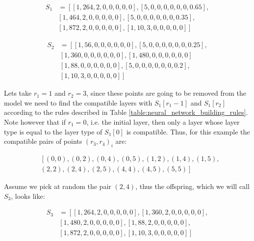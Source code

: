 \documentclass[journal]{IEEEtran}
\begin{document}
\begin{align*}
S_1 & = \left[ \left[1, 264, 2, 0, 0, 0, 0, 0 \right], \left[5, 0, 0, 0, 0, 0, 0, 0.65 \right], \right. \\
& \left. \left[1, 464, 2, 0, 0, 0, 0, 0 \right], \left[5, 0, 0, 0, 0, 0, 0, 0.35 \right], \right. \\
& \left. \left[1, 872, 2, 0, 0, 0, 0, 0 \right], \left[1, 10, 3, 0, 0, 0, 0, 0 \right] \right]
\end{align*}

\begin{align*}
S_2 & = \left[ \left[1, 56, 0, 0, 0, 0, 0, 0 \right], \left[5, 0, 0, 0, 0, 0, 0, 0.25 \right], \right. \\
&  \left. \left[1, 360, 0, 0, 0, 0, 0, 0 \right], \left[1, 480, 0, 0, 0, 0, 0, 0 \right] \right. \\
&  \left. \left[1, 88, 0, 0, 0, 0, 0, 0 \right], \left[5, 0, 0, 0, 0, 0, 0, 0.2 \right], \right. \\
&  \left. \left[1, 10, 3, 0, 0, 0, 0, 0 \right] \right]
\end{align*}

Lets take $r_1 = 1$ and $r_2 = 3$, since these points are going to be removed from the model we need to find the compatible layers with $S_1[r_1-1]$ and $S_1[r_2]$ according to the rules described in Table \ref{table:neural_network_building_rules}. Note however that if $r_1 = 0$, i.e. the initial layer, then only a layer whose layer type is equal to the layer type of $S_1[0]$ is compatible. Thus, for this example the compatible pairs of points $(r_3, r_4)_i$ are:

\begin{align*}
& \left[ (0, 0), (0, 2), (0, 4), (0, 5), (1, 2), (1, 4), (1, 5), \right. \\
& \left. (2, 2), (2, 4), (2, 5), (4, 4), (4, 5), (5, 5) \right]
\end{align*} 

Assume we pick at random the pair $(2,4)$, thus the offspring, which we will call $S_3$, looks like:

\begin{align*}
S_3 & = \left[ \left[1, 264, 2, 0, 0, 0, 0, 0 \right], \left[1, 360, 2, 0, 0, 0, 0, 0 \right], \right. \\
& \left. \left[1, 480, 2, 0, 0, 0, 0, 0 \right] , \left[1, 88, 2, 0, 0, 0, 0, 0 \right], \right. \\
& \left. \left[1, 872, 2, 0, 0, 0, 0, 0 \right], \left[1, 10, 3, 0, 0, 0, 0, 0 \right] \right]
\end{align*}
\end{document}
